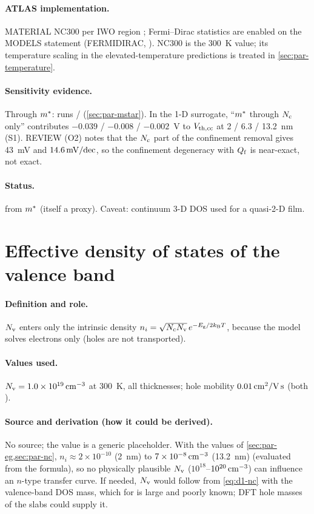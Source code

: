 \paragraph{ATLAS implementation.}
MATERIAL NC300 per IWO region \citep[p.~1340]{AtlasManual}; Fermi--Dirac statistics are enabled on the MODELS
statement (FERMIDIRAC, \citealp[p.~1433]{AtlasManual}). NC300 is the 300~K value; its temperature scaling in the
elevated-temperature predictions is treated in \cref{sec:par-temperature}.

\paragraph{Sensitivity evidence.}
Through $m^{*}$: runs / (\cref{sec:par-mstar}). In the 1-D surrogate, ``$m^{*}$ through $N_{\mathrm{c}}$
only'' contributes $-0.039$ / $-0.008$ / $-0.002$~V to $V_{\mathrm{th,cc}}$ at 2 / 6.3 / 13.2~nm (S1). REVIEW (O2) notes that the
$N_{\mathrm{c}}$ part of the confinement removal gives 43~mV and $14.6\,\mathrm{mV/dec}$, so the confinement degeneracy with $Q_{\mathrm{f}}$ is
near-exact, not exact.

\paragraph{Status.}
 from $m^{*}$ (itself a proxy). Caveat: continuum 3-D DOS used for a quasi-2-D film.

\section{Effective density of states of the valence band}
\label{sec:par-nv}

\paragraph{Definition and role.}
$N_{\mathrm{v}}$ enters only the intrinsic density $n_i = \sqrt{N_{\mathrm{c}}N_{\mathrm{v}}}\,e^{-E_{\mathrm{g}}/2k_{\mathrm{B}}T}$, because the model solves
electrons only (holes are not transported).

\paragraph{Values used.}
$N_{\mathrm{v}} = 1.0\times10^{19}\,\mathrm{cm}^{-3}$ at 300~K, all thicknesses; hole mobility $0.01\,\mathrm{cm}^{2}/\mathrm{V\,s}$ (both ).

\paragraph{Source and derivation (how it could be derived).}
No source; the value is a generic placeholder. With the values of \cref{sec:par-eg,sec:par-nc},
$n_i \approx 2\times10^{-10}$ (2~nm) to $7\times10^{-8}\,\mathrm{cm}^{-3}$ (13.2~nm) (evaluated from the formula), so no
physically plausible $N_{\mathrm{v}}$ ($10^{18}$--$10^{20}\,\mathrm{cm}^{-3}$) can influence an $n$-type transfer curve. If needed,
$N_{\mathrm{v}}$ would follow from \cref{eq:d1-nc} with the valence-band DOS mass, which for \InO{} is large and poorly
known; DFT hole masses of the slabs could supply it.

